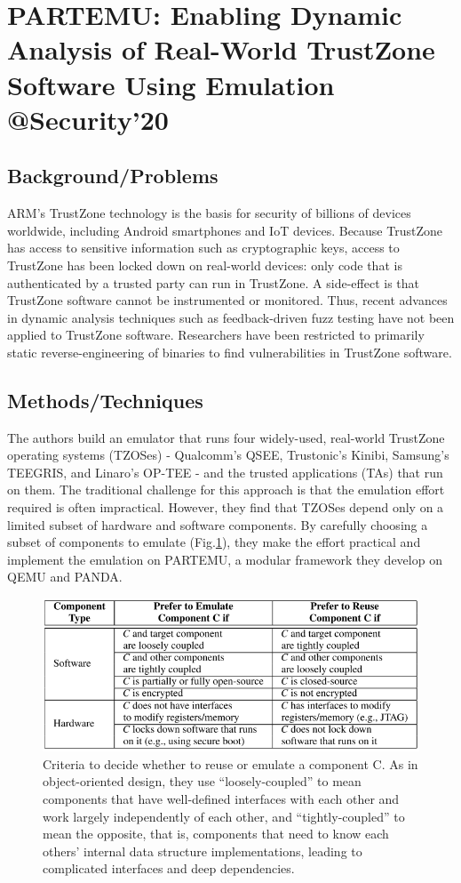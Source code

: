 \section{PARTEMU: Enabling Dynamic Analysis of Real-World TrustZone Software Using Emulation \\@Security'20}
\subsection{Background/Problems}
ARM’s TrustZone technology is the basis for security of billions of devices worldwide, including Android smartphones and IoT devices. Because TrustZone has access to sensitive information such as cryptographic keys, access to TrustZone has been locked down on real-world devices: only code that is authenticated by a trusted party can run in TrustZone. A side-effect is that TrustZone software cannot be instrumented or monitored. Thus, recent advances in dynamic analysis techniques such as feedback-driven fuzz testing have not been applied to TrustZone software. Researchers have been restricted to primarily static reverse-engineering of binaries to find vulnerabilities in TrustZone software.
\subsection{Methods/Techniques}
The authors build an emulator that runs four widely-used, real-world TrustZone operating systems (TZOSes) - Qualcomm’s QSEE, Trustonic’s Kinibi, Samsung’s TEEGRIS, and Linaro’s OP-TEE - and the trusted applications (TAs) that run on them. The traditional challenge for this approach is that the emulation effort required is often impractical. However, they find that TZOSes depend only on a limited subset of hardware and software components. By carefully choosing a subset of components to emulate (Fig.\ref{fig:partemu}), they make the effort practical and implement the emulation on PARTEMU, a modular framework they develop on QEMU and PANDA.
\begin{figure}[h]
    \centering
    \includegraphics[width=.9\linewidth]{partemu.png} %
    \caption{Criteria to decide whether to reuse or emulate a component C. As in object-oriented design, they use “loosely-coupled” to mean components that have well-defined interfaces with each other and work largely independently of each other, and “tightly-coupled” to mean the opposite, that is, components that need to know each others’ internal data structure implementations, leading to complicated interfaces and deep dependencies.}	
    \label{fig:partemu}
\end{figure}

